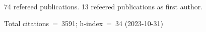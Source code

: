 74 refereed publications. 13 refeered publications as first author.

Total citations~=~3591; h-index~=~34 (2023-10-31)